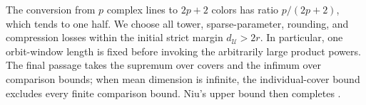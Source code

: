 The conversion from $p$ complex lines to $2p+2$ colors has ratio
$p/(2p+2)$, which tends to one half. We choose all tower, sparse-parameter,
rounding, and compression losses within the initial strict margin
$d_{\mathcal U}>2r$. In particular, one orbit-window length is fixed
before invoking the arbitrarily large product powers. The final passage
takes the supremum over covers and the infimum over comparison bounds;
when mean dimension is infinite, the individual-cover bound excludes
every finite comparison bound. Niu's upper bound then completes
.
